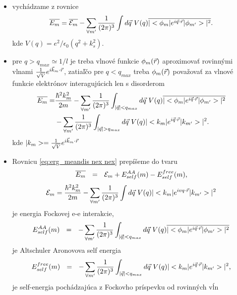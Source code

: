 \documentclass[
	11pt, %
]{beamer}
\begin{document}
\begin{frame}
\begin{itemize}
\item vychádzame z rovnice
\begin{equation}
\label{eq:erg_meandis nex}
 \overline{E_m}=\overline{\mathcal{E}_m}-\sum_{\forall m'} \frac{1}{(2\pi)^{3}} \int d\vec{q}\ V(q) \overline{|<\phi_m|e^{i\vec{q}\cdot\vec{r}}|\phi_{m'}>|^2} \text{.}
\end{equation}
kde $V(q) = e^2/\epsilon_0(q^2+k_s^2)$.
\item pre $q > q_{max} \simeq 1/l$ je treba vlnové funkcie $\phi_m(\vec{r})$ aproximovať rovinnými vlnami $\frac{1}{\sqrt V}e^{i\vec{k}_m\cdot\vec{r}}$, zatiaľčo pre $q < q_{max}$ treba
$\phi_m(\vec{r})$ považovať za vlnové funkcie elektrónov interagujúcich len s disorderom
\begin{equation}\label{eq:erg_meandis nex nex}
\begin{split}
 \overline{E_m}= &\frac{\hbar^2 k_m^2}{2m} - \sum_{\forall m'} \frac{1}{(2\pi)^{3}} \int_{|\vec{q}| < q_{max}} d\vec{q}\ V(q) \overline{|<\phi_m|e^{i\vec{q}\cdot\vec{r}}|\phi_{m'}>|^2}  \\
    &  - \sum_{\forall m'} \frac{1}{(2\pi)^{3}} \int_{|\vec{q}| > q_{max}} d\vec{q}\ V(q) |<k_m|e^{i\vec{q}\cdot\vec{r}}|k_{m'}>|^2 \text{.}
\end{split}
\end{equation}
kde $|k_{m}>= \frac{1}{\sqrt V}e^{i\vec{k}_m\cdot\vec{r}}$
\end{itemize}
\end{frame}
\begin{frame}
\begin{itemize}
\item Rovnicu \eqref{eq:erg_meandis nex nex} prepíšeme do tvaru
\begin{equation}\label{eq:erg_meandis nex prepis skratka}
 \overline{E_m} \ \ = \ \ \mathcal{E}_m + E_{self}^{AA}(m) - E_{self}^{free}(m)  \text{,}
\end{equation}
\begin{equation}\label{eq:erg_volna castica s ee}
\mathcal{E}_m = \frac{\hbar^2 k_m^2}{2m} - \sum_{\forall m'} \frac{1}{(2\pi)^{3}} \int d\vec{q}\ V(q) |<k_m|e^{ivq\cdot\vec{r}}|k_{m'}>|^2  \text{}
\end{equation}
je energia  Fockovej e-e interakcie,
\begin{equation}\label{eq:erg_self AA}
 E_{self}^{AA}(m) \ \ = \ \  -\sum_{\forall m'} \frac{1}{(2\pi)^{3}} \int_{|\vec{q}| < q_{max}} d\vec{q}\ V(q) \overline{|<\phi_m|e^{i\vec{q}\cdot\vec{r}}|\phi_{m'}>|^2}  \text{}
\end{equation}
je Altschuler Aronovova self energia
\begin{equation}\label{eq:erg_self free}
 E_{self}^{free}(m) \ \ =  \ \  - \sum_{\forall m'} \frac{1}{(2\pi)^{3}} \int_{|\vec{q}| < q_{max}} d\vec{q}\ V(q) |<k_m|e^{i\vec{q}\cdot\vec{r}}|k_{m'}>|^2\text{,}
\end{equation}
je self-energia pochádzajúca z Fockovho príspevku od rovinných vĺn
\end{itemize}
\end{frame}
\end{document}
